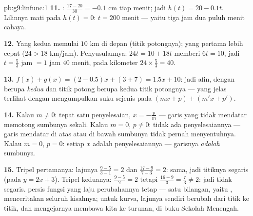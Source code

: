 \begin{solution}{pb:g9:linfunc:1}
\textbf{11.} : $\frac{17 - 20}{30} = -0.1$ cm tiap menit;
jadi $h(t) = 20 - 0.1t$. Lilinnya mati pada $h(t) = 0$: $t = 200$
menit --- yaitu tiga jam dua puluh menit cahaya.

\textbf{12.} Yang kedua memulai $10$ km di depan (titik potongnya);
yang pertama lebih cepat ($24 > 18$ km/jam). Penyusulannya:
$24t = 10 + 18t$ memberi $6t = 10$, jadi $t = \frac53$ jam $= 1$ jam
$40$ menit, pada kilometer $24 \times \frac53 = 40$.

\textbf{13.} $f(x) + g(x) = (2 - 0.5)x + (3 + 7) = 1.5x + 10$:
jadi afin, dengan  berupa \emph{ kedua } dan
titik potong berupa  kedua titik potongnya --- yang jelas
terlihat dengan mengumpulkan suku sejenis pada $(mx + p) + (m'x + p')$.

\textbf{14.} Kalau $m \neq 0$: tepat satu penyelesaian,
$x = -\frac pm$ --- garis yang tidak mendatar memotong sumbunya
sekali. Kalau $m = 0$, $p \neq 0$: tidak ada penyelesaiannya --- garis
mendatar di atas atau di bawah sumbunya tidak pernah menyentuhnya.
Kalau $m = 0$, $p = 0$: setiap $x$ adalah penyelesaiannya --- garisnya
\emph{adalah} sumbunya.

\textbf{15.} Tripel pertamanya: lajunya $\frac{9 - 5}{3 - 1} = 2$ dan
$\frac{17 - 9}{7 - 3} = 2$: sama, jadi titiknya segaris (pada
$y = 2x + 3$). Tripel keduanya: $\frac{9-5}{2} = 2$ tetapi
$\frac{16 - 9}{3} = \frac73 \neq 2$: jadi tidak segaris. 
persis fungsi yang laju perubahannya tetap ---
satu bilangan, yaitu , menceritakan seluruh kisahnya; untuk
kurva, lajunya sendiri berubah dari titik ke titik, dan mengejarnya
membawa kita ke turunan, di buku Sekolah Menengah.

\end{solution}
